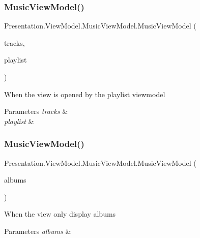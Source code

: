 \subsubsection{\texorpdfstring{Music\+View\+Model()}{MusicViewModel()}\hspace{0.1cm}{\footnotesize\ttfamily [2/4]}}
{\footnotesize\ttfamily Presentation.\+View\+Model.\+Music\+View\+Model.\+Music\+View\+Model (\begin{DoxyParamCaption}\item[{Observable\+Collection$<$ \hyperlink{class_d_t_o_1_1_entity_1_1_track}{Track} $>$}]{tracks,  }\item[{\hyperlink{class_d_t_o_1_1_entity_1_1_playlist}{Playlist}}]{playlist }\end{DoxyParamCaption})}



When the view is opened by the playlist viewmodel 


\begin{DoxyParams}{Parameters}
{\em tracks} & \\
\hline
{\em playlist} & \\
\hline
\end{DoxyParams}
\mbox{\label{class_presentation_1_1_view_model_1_1_music_view_model_a5856bb1decf95ae383427219e6598706}} 
\subsubsection{\texorpdfstring{Music\+View\+Model()}{MusicViewModel()}\hspace{0.1cm}{\footnotesize\ttfamily [3/4]}}
{\footnotesize\ttfamily Presentation.\+View\+Model.\+Music\+View\+Model.\+Music\+View\+Model (\begin{DoxyParamCaption}\item[{Observable\+Collection$<$ \hyperlink{class_d_t_o_1_1_entity_1_1_album}{Album} $>$}]{albums }\end{DoxyParamCaption})}



When the view only display albums 


\begin{DoxyParams}{Parameters}
{\em albums} & \\
\hline
\end{DoxyParams}
\mbox{\label{class_presentation_1_1_view_model_1_1_music_view_model_a0b884bbf52c755226eac57a6b68a4e41}} 

